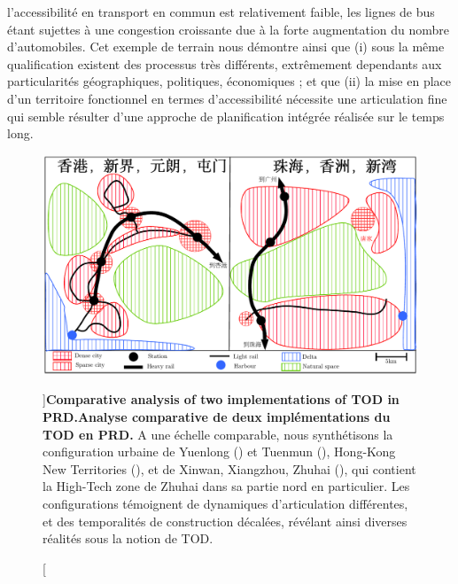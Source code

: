 {l'accessibilité en transport en commun est relativement faible, les lignes de bus étant sujettes à une congestion croissante due à la forte augmentation du nombre d'automobiles. Cet exemple de terrain nous démontre ainsi que (i) sous la même qualification existent des processus très différents, extrêmement dependants aux particularités géographiques, politiques, économiques ; et que (ii) la mise en place d'un territoire fonctionnel en termes d'accessibilité nécessite une articulation fine qui semble résulter d'une approche de planification intégrée réalisée sur le temps long.
}



\begin{figure}
	\includegraphics[width=\linewidth]{Figures/Qualitative/tod}
	\caption[][]{\textbf{Comparative analysis of two implementations of TOD in PRD.}\label{fig:qualitative:schema}}{\textbf{Analyse comparative de deux implémentations du TOD en PRD.} A une échelle comparable, nous synthétisons la configuration urbaine de Yuenlong () et Tuenmun (), Hong-Kong New Territories (), et de Xinwan, Xiangzhou, Zhuhai (), qui contient la High-Tech zone de Zhuhai dans sa partie nord en particulier. Les configurations témoignent de dynamiques d'articulation différentes, et des temporalités de construction décalées, révélant ainsi diverses réalités sous la notion de TOD.\label{fig:qualitative:schema}}
\end{figure}





